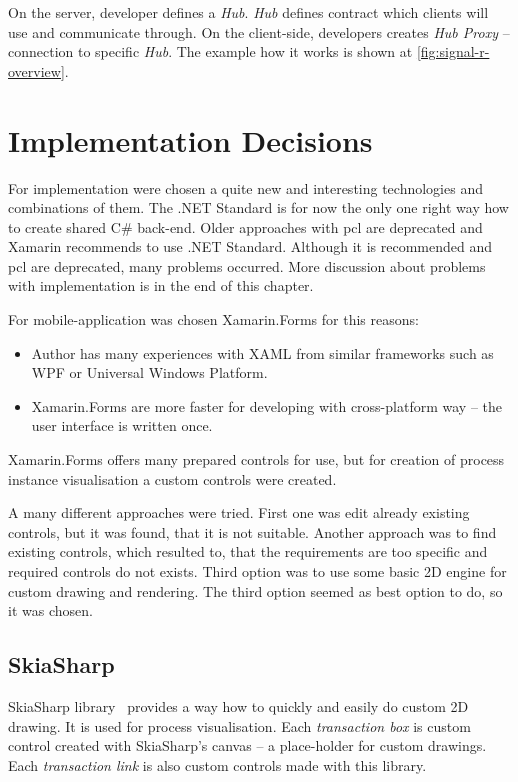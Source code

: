 On the server, developer defines a \textit{Hub}. \textit{Hub} defines contract which clients will use and communicate through. On the client-side, developers creates \textit{Hub Proxy} -- connection to specific \textit{Hub}. The example how it works is shown at \cref{fig:signal-r-overview}.
\section{Implementation Decisions}
For implementation were chosen a quite new and interesting technologies and combinations of them.
The .NET Standard is for now the only one right way how to create shared C\# back-end. Older approaches with \gls{pcl} are deprecated and Xamarin recommends to use .NET Standard. Although it is recommended and \gls{pcl} are deprecated, many problems occurred. More discussion about problems with implementation is in the end of this chapter.

For mobile-application was chosen Xamarin.Forms for this reasons:
\begin{itemize}
\item Author has many experiences with XAML from similar frameworks such as WPF or Universal Windows Platform.
\item Xamarin.Forms are more faster for developing with cross-platform way -- the user interface is written once.
\end{itemize}

Xamarin.Forms offers many prepared controls for use, but for creation of process instance visualisation a custom controls were created.  

A many different approaches were tried. First one was edit already existing controls, but it was found, that it is not suitable. Another approach was to find existing controls, which resulted to, that the requirements are too specific and required controls do not exists. Third option was to use some basic 2D engine for custom drawing and rendering. The third option seemed as best option to do, so it was chosen. 
\subsection{SkiaSharp}
SkiaSharp library~\cite{skiasharp} provides a way how to quickly and easily do custom 2D drawing. It is used for process visualisation. Each \textit{transaction box} is custom control created with SkiaSharp's canvas -- a place-holder for custom drawings. Each \textit{transaction link} is also custom controls made with this library. 

